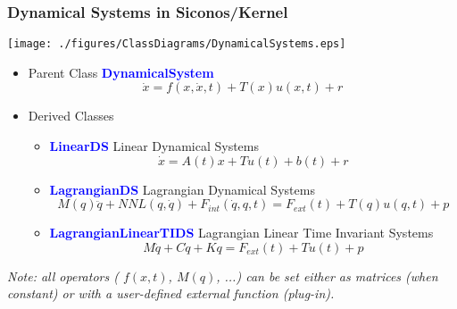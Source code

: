 \frame
{
\frametitle{Dynamical Systems in Siconos/Kernel}
 \begin{center}\texttt{[image: ./figures/ClassDiagrams/DynamicalSystems.eps]}\end{center}
 \begin{itemize}
 \item Parent Class \textcolor{blue}{\textbf{DynamicalSystem}}
   \begin{equation*}\label{DS}
     \dot x = f(x,\dot x,t)+ T(x) u(x,t) + r
   \end{equation*}
   \pause
 \item Derived Classes
   \begin{itemize}
   \item \textcolor{blue}{\textbf{LinearDS}} Linear Dynamical Systems
     \begin{equation*}\label{LDS}
       \dot x = A(t)x + Tu(t) + b(t) + r
     \end{equation*}
   \item \textcolor{blue}{\textbf{LagrangianDS}} Lagrangian Dynamical Systems
     \begin{equation*}\label{LagrangianDS}
       M(q)\ddot q + NNL(q,\dot q) + F_{int}(\dot q, q,t) = F_{ext}(t) + T(q)u(q,t) + p
     \end{equation*}
   \item \textcolor{blue}{\textbf{LagrangianLinearTIDS}} Lagrangian Linear Time Invariant Systems 
     \begin{equation*}
       M\ddot q + C\dot q +Kq = F_{ext}(t) + Tu(t) + p 
     \end{equation*}
   \end{itemize}
 \end{itemize}

 {\it Note: all operators ( $f(x,t)$, $M(q)$, ...) can be set either as matrices (when constant) or with a user-defined external function (plug-in).}
}

